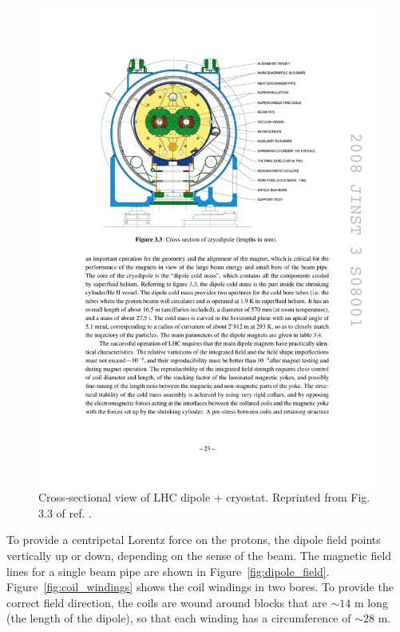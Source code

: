 \documentclass[dissertation.tex]{subfiles}
\begin{document}
\begin{figure}
	\centering
	\includegraphics[scale=1.0]{LHC_dipole_cross_section}
	\caption{Cross-sectional view of LHC dipole + cryostat.  Reprinted from Fig. 3.3 of ref. \cite{LHC_paper}.}
	\label{fig:LHC_dipole_cross_section}
\end{figure}

To provide a centripetal Lorentz force on the protons, the dipole field points vertically up or down, depending on the sense of the beam.  The magnetic field lines for a single beam pipe are shown in Figure~\ref{fig:dipole_field}.  Figure~\ref{fig:coil_windings} shows the coil windings in two bores.  To provide the correct field direction, the coils are wound around blocks that are $\sim14$ m long (the length of the dipole), so that each winding has a circumference of $\sim28$ m.
\end{document}
